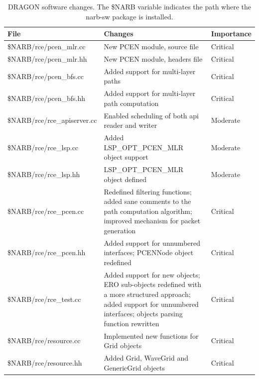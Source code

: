 \documentclass[10pt,a4paper]{report}
\begin{document}
\begin{table}[!htbp]
  \begin{center}
    \begin{tabular}{|l|p{}|l|}
      \hline
      \textbf{File} & \textbf{Changes} & \textbf{Importance} \\\hline
      \$NARB/rce/pcen\_mlr.cc & New PCEN module, source file &
      Critical \\\hline
      \$NARB/rce/pcen\_mlr.hh & New PCEN module, headers file &
      Critical \\\hline
      \$NARB/rce/pcen\_bfs.cc & Added support for multi-layer paths &
      Critical \\\hline
      \$NARB/rce/pcen\_bfs.hh & Added support for multi-layer path
      computation & Critical \\\hline
      \$NARB/rce/rce\_apiserver.cc & Enabled scheduling of both api
      reader and writer & Moderate \\\hline
      \$NARB/rce/rce\_lsp.cc & Added LSP\_OPT\_PCEN\_MLR object
      support & Moderate \\\hline
      \$NARB/rce/rce\_lsp.hh & LSP\_OPT\_PCEN\_MLR object defined &
      Moderate \\\hline
      \$NARB/rce/rce\_pcen.cc & Redefined filtering functions; added
      sane comments to the path computation algorithm; improved
      mechanism for packet generation & Critical \\\hline
      \$NARB/rce/rce\_pcen.hh & Added support for unnumbered
      interfaces; PCENNode object redefined & Critical \\\hline
      \$NARB/rce/rce\_test.cc & Added support for new objects; ERO
      sub-objects redefined with a more structured approach; added
      support for unnumbered interfaces; objects parsing function
      rewritten & Critical \\\hline
      \$NARB/rce/resource.cc & Implemented new functions for Grid
      objects & Critical \\\hline
      \$NARB/rce/resource.hh & Added Grid, WaveGrid and GenericGrid
      objects & Critical \\
      \hline
    \end{tabular}
    \caption[DRAGON software changes]{DRAGON software
      changes. The \$NARB variable indicates the path where the
      narb-sw package is installed.}
    \label{tab:dragon_changes}
  \end{center}
\end{table}
\end{document}
